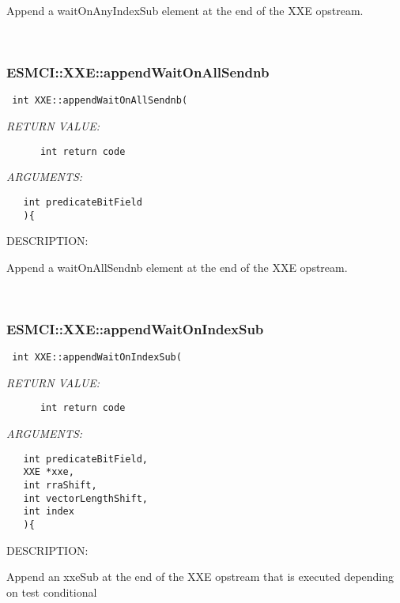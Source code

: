     Append a waitOnAnyIndexSub element at the end of the XXE opstream. 
 
\mbox{}\hrulefill\
 
\subsubsection [ESMCI::XXE::appendWaitOnAllSendnb] {ESMCI::XXE::appendWaitOnAllSendnb}


  
\begin{verbatim} int XXE::appendWaitOnAllSendnb(\end{verbatim}{\em RETURN VALUE:}
\begin{verbatim}      int return code\end{verbatim}{\em ARGUMENTS:}
\begin{verbatim}   int predicateBitField
   ){\end{verbatim}
{\sf DESCRIPTION:\\ }


    Append a waitOnAllSendnb element at the end of the XXE opstream. 
 
\mbox{}\hrulefill\
 
\subsubsection [ESMCI::XXE::appendWaitOnIndexSub] {ESMCI::XXE::appendWaitOnIndexSub}


  
\begin{verbatim} int XXE::appendWaitOnIndexSub(\end{verbatim}{\em RETURN VALUE:}
\begin{verbatim}      int return code\end{verbatim}{\em ARGUMENTS:}
\begin{verbatim}   int predicateBitField,
   XXE *xxe,
   int rraShift,
   int vectorLengthShift,
   int index
   ){\end{verbatim}
{\sf DESCRIPTION:\\ }


    Append an xxeSub at the end of the XXE opstream that is executed depending
    on test conditional 
 
\mbox{}\hrulefill\
 
